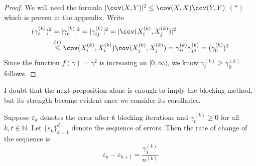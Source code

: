 \documentclass[11pt,english,a4paper]{article}
\begin{document}
\begin{proof}
We will need the formula $| \cov (X,Y) |^2 \leq \cov (X,X) \cov (Y,Y)$ $(*)$ which is proven in the appendix. Write
\begin{align*}
(\gamma_{t}^{(k)})^2 &= |\gamma^{(k)}_t|^2 = |\gamma_{ij}^{(k)}|^2 = | \cov (X^{(k)}_i,X^{(k)}_j) |^2 \\
&\stackrel{(*)}{\leq} \cov (X^{(k)}_i,X^{(k)}_i) \cov (X^{(k)}_j,X^{(k)}_j) = \gamma_{ii}^{(k)}\gamma_{jj}^{(k)} = (\gamma_0^{(k)})^2
\end{align*}
Since the function $f(\gamma) = \gamma^2$ is increasing on $[0,\infty)$, we know $\gamma_t^{(k)} \geq \gamma_0^{(k)}$ follows.
\end{proof}
I doubt that the next proposition alone is enough to imply the blocking method, but its strength become evident once we consider its corollaries.
\begin{prop}
Suppose $\varepsilon_k$ denotes the error after $k$ blocking iterations and $\gamma^{(k)}_t \geq 0$ for all $k,t \in \mathbb{N}$. Let $\{\varepsilon_k\}_{  k=1}^d$ denote the sequence of errors. Then the rate of change of the sequence is
\begin{equation}
\varepsilon_k - \varepsilon_{  k+1} = \frac{\gamma_1^{(k)} }{n^{(k)}} \label{eq:rate}
\end{equation}
\label{prop:diff}
\end{prop}
\end{document}
